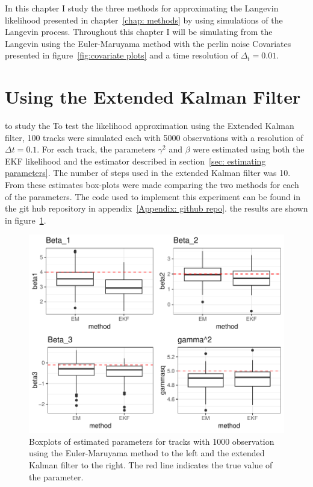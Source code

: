 


In this chapter I study the three methods for approximating the Langevin likelihood presented in chapter~\ref{chap: methods} by using simulations of the Langevin process. Throughout this chapter I will be simulating from the Langevin using the Euler-Maruyama method with the perlin noise Covariates presented in figure~\ref{fig:covariate plots} and a time resolution of $\Delta_t =0.01$.




\section{Using the Extended Kalman Filter}


to study the 
To test the likelihood approximation using the Extended Kalman filter, 100 tracks were simulated each with 5000 observations with a resolution of $\Delta t = 0.1$. For each track, the parameters $\gamma^2$ and $\beta$ were estimated using both the EKF likelihood and the estimator described in section~\ref{sec: estimating parameters}. The number of steps used in the extended Kalman filter was 10. From these estimates box-plots were made comparing the two methods for each of the parameters. The code used to implement this experiment can be found in the git hub repository in appendix~\ref{Appendix: github repo}. the results are shown in figure~\ref{fig:EKF_thin_boxplot}.

 

\begin{figure}[H]
    \centering
    \includegraphics[width=\linewidth]{Images/Results/EM VS EKF boxplots.pdf}
    \caption[example 1 covariates]{Boxplots of estimated parameters for tracks with 1000 observation using the Euler-Maruyama method to the left and the extended Kalman filter to the right. The red line indicates the true value of the parameter.}
    \label{fig:EKF_thin_boxplot}
\end{figure}

